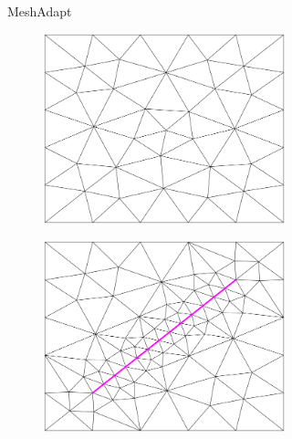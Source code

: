\begin{figure}[p]
\begin{subfigure}[b]{\textwidth}
\begin{subfigure}[b]{0.33\textwidth}
        \end{subfigure}
        \caption{MeshAdapt}
        \label{fig:Gmsh-MeshAdapt}
    \end{subfigure}
    \begin{subfigure}[b]{\textwidth}
    \centering
        \begin{subfigure}[b]{0.33\textwidth}
            \centering
            \includegraphics[width=\textwidth]{report/Images/Software/Gmsh meshing algorithms/gmsh_meshing_algorithms_delaunay.png}
        \end{subfigure}
        \begin{subfigure}[b]{0.33\textwidth}
            \centering
            \includegraphics[width=\textwidth]{report/Images/Software/Gmsh meshing algorithms/gmsh_meshing_algorithms_embedded_delaunay.png}

\end{subfigure}
\end{subfigure}
\end{figure}
